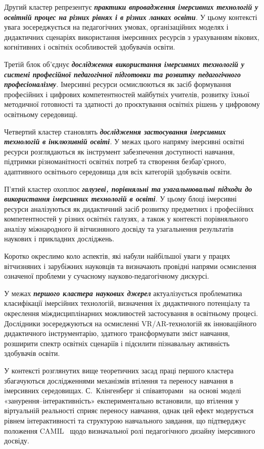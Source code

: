 Другий кластер репрезентує \emph{\textbf{практики впровадження імерсивних технологій у освітній процес на різних рівнях і в різних ланках освіти}.} У цьому контексті увага зосереджується на педагогічних умовах, організаційних моделях і дидактичних сценаріях використання імерсивних ресурсів з урахуванням вікових, когнітивних і освітніх особливостей здобувачів освіти.

Третій блок об'єднує \emph{\textbf{дослідження використання імерсивних технологій у системі професійної педагогічної підготовки та розвитку педагогічного професіоналізму}.} Імерсивні ресурси осмислюються як засіб формування професійних і цифрових компетентностей майбутніх учителів, розвитку їхньої методичної готовності та здатності до проєктування освітніх рішень у цифровому освітньому середовищі.

Четвертий кластер становлять \emph{\textbf{дослідження застосування імерсивних технологій в інклюзивній освіті}.} У межах цього напряму імерсивні освітні ресурси розглядаються як інструмент забезпечення доступності навчання, підтримки різноманітності освітніх потреб та створення безбар'єрного, адаптивного освітнього середовища для всіх категорій здобувачів освіти.

П'ятий кластер охоплює \emph{\textbf{галузеві, порівняльні та узагальнювальні підходи до використання імерсивних технологій в освіті}.} У цьому блоці імерсивні ресурси аналізуються як дидактичний засіб розвитку предметних і професійних компетентностей у різних освітніх галузях, а також у контексті порівняльного аналізу міжнародного й вітчизняного досвіду та узагальнення результатів наукових і прикладних досліджень.

Коротко окреслимо коло аспектів, які набули найбільшої уваги у працях вітчизняних і зарубіжних науковців та визначають провідні напрями осмислення означеної проблеми у сучасному науково-педагогічному дискурсі.


У межах \emph{\textbf{першого кластера наукових джерел}} актуалізується проблематика класифікації імерсійних технологій, визначення їх дидактичного потенціалу та окреслення міждисциплінарних можливостей застосування в освітньому процесі. Дослідники зосереджуються на осмисленні VR/AR-технологій як інноваційного дидактичного інструментарію, здатного трансформувати зміст навчання, розширити спектр освітніх сценаріїв і підсилити пізнавальну активність здобувачів освіти.

У контексті розглянутих вище теоретичних засад праці першого кластера збагачуються дослідженнями механізмів втілення та переносу навчання в імерсивних середовищах. С.~Клінгенберг зі співавторами~\cite{Klingenberg2024Embodiment} на основі моделі «занурення--інтерактивність» експериментально встановили, що втілення у віртуальній реальності сприяє переносу навчання, однак цей ефект модерується рівнем інтерактивності та структурою навчального завдання, що підтверджує положення CAMIL~\cite{Makransky2021CAMIL} щодо визначальної ролі педагогічного дизайну імерсивного досвіду.

